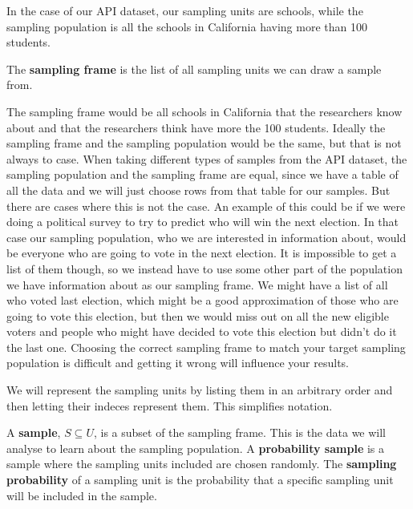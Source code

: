 \documentclass{article}
\begin{document}
In the case of our API dataset, our sampling units are schools, while
the sampling population is all the schools in California having more than 100 students.

\begin{definition} \label{def:sampFrame}
 The \textbf{sampling frame} is the list of all sampling units we can draw a
 sample from.
\end{definition}

The sampling frame would be all schools in California that the researchers know
about and that the researchers think have more the 100 students.
Ideally the sampling frame and the sampling population would be the same, but that is not always to case.
When taking different types of samples from the API dataset, the sampling population and the sampling frame are equal, since
we have a table of all the data and we will just choose rows from that table for
our samples. But there are cases where this is not the case. An example of this
could be if we were doing a political survey to try to predict who will win the
next election.
In that case our sampling population, who we are interested in information
about, would be everyone who are going to vote in the next election. It is
impossible to get a list of them though, so we instead have to use 
some other part of the population we have information about as our sampling frame. We might have a
list of all who voted last election, which might be a good approximation of
those who are going to vote this election, but then we would miss out on all the
new eligible voters and people who might have decided to vote this election but
didn't do it the last one.
Choosing the correct sampling frame to match your target sampling population is
difficult and getting it wrong will influence your results.

We will represent the sampling units by listing them in an arbitrary order and
then letting their indeces represent them. This simplifies notation.


\begin{definition} \label{def:sample}
A \textbf{sample}, \(S \subseteq U\), is a subset of the sampling frame. This is the data we will analyse to learn about the sampling population.
A \textbf{probability sample} is a sample where the sampling units included are chosen randomly.
The \textbf{sampling probability} of a sampling unit is the probability that a
specific sampling unit will be included in the sample.
\end{definition}
\end{document}
